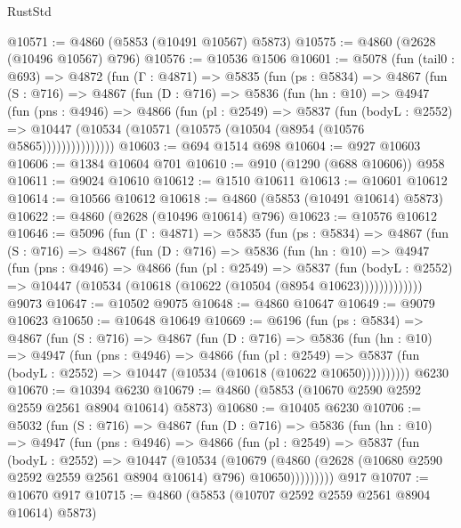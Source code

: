 \begin{lexlean}{RustStd}
\begin{coremodule}
@10571 := @4860 (@5853 (@10491 @10567) @5873)
@10575 := @4860 (@2628 (@10496 @10567) @796)
@10576 := @10536 @1506
@10601 := @5078
    (fun (tail0 : @693) =>
    @4872
      (fun (Γ : @4871) =>
      @5835
        (fun (ps : @5834) =>
        @4867
          (fun (S : @716) =>
          @4867
            (fun (D : @716) =>
            @5836
              (fun (hn : @10) =>
              @4947
                (fun (pns : @4946) =>
                @4866
                  (fun (pl : @2549) =>
                  @5837
                    (fun (bodyL : @2552) =>
                    @10447 (@10534 (@10571 (@10575 (@10504 (@8954 (@10576 @5865)))))))))))))))
@10603 := @694 @1514 @698
@10604 := @927 @10603
@10606 := @1384 @10604 @701
@10610 := @910 (@1290 (@688 @10606)) @958
@10611 := @9024 @10610
@10612 := @1510 @10611
@10613 := @10601 @10612
@10614 := @10566 @10612
@10618 := @4860 (@5853 (@10491 @10614) @5873)
@10622 := @4860 (@2628 (@10496 @10614) @796)
@10623 := @10576 @10612
@10646 := @5096
    (fun (Γ : @4871) =>
    @5835
      (fun (ps : @5834) =>
      @4867
        (fun (S : @716) =>
        @4867
          (fun (D : @716) =>
          @5836
            (fun (hn : @10) =>
            @4947
              (fun (pns : @4946) =>
              @4866
                (fun (pl : @2549) =>
                @5837
                  (fun (bodyL : @2552) =>
                  @10447 (@10534 (@10618 (@10622 (@10504 (@8954 @10623)))))))))))))
    @9073
@10647 := @10502 @9075
@10648 := @4860 @10647
@10649 := @9079 @10623
@10650 := @10648 @10649
@10669 := @6196
    (fun (ps : @5834) =>
    @4867
      (fun (S : @716) =>
      @4867
        (fun (D : @716) =>
        @5836
          (fun (hn : @10) =>
          @4947
            (fun (pns : @4946) =>
            @4866
              (fun (pl : @2549) =>
              @5837 (fun (bodyL : @2552) => @10447 (@10534 (@10618 (@10622 @10650))))))))))
    @6230
@10670 := @10394 @6230
@10679 := @4860 (@5853 (@10670 @2590 @2592 @2559 @2561 @8904 @10614) @5873)
@10680 := @10405 @6230
@10706 := @5032
    (fun (S : @716) =>
    @4867
      (fun (D : @716) =>
      @5836
        (fun (hn : @10) =>
        @4947
          (fun (pns : @4946) =>
          @4866
            (fun (pl : @2549) =>
            @5837
              (fun (bodyL : @2552) =>
              @10447
                (@10534
                  (@10679
                    (@4860
                      (@2628 (@10680 @2590 @2592 @2559 @2561 @8904 @10614) @796)
                      @10650)))))))))
    @917
@10707 := @10670 @917
@10715 := @4860 (@5853 (@10707 @2592 @2559 @2561 @8904 @10614) @5873)

\end{coremodule}
\end{lexlean}
